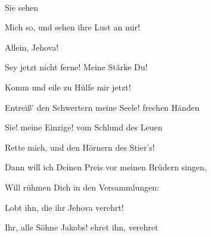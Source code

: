 \begin{aufza}
{\begin{aufzb}
\end{aufzb}\par
{}\par
\begin{aufzb}\item[]
\par
{}~\par
\end{aufzb}\par
{} Sie sehen\par
\begin{aufzb}\item[]
Mich so, und sehen ihre Lust an mir!\par
{}\par
\end{aufzb}\par
{} Allein, Jehova!\par
\begin{aufzb}\item[]
Sey jetzt nicht ferne! Meine Stärke Du!\par
Komm und eile zu Hülfe mir jetzt!\par
\end{aufzb}\par
Entreiß' den Schwertern meine Seele! frechen Händen\par
\begin{aufzb}\item[]
Sie! meine Einzige! vom Schlund des Leuen\par
Rette mich, und den Hörnern des Stier's!\par
\end{aufzb}\par
Dann will ich Deinen Preis vor meinen Brüdern singen,\par
\begin{aufzb}\item[]
Will rühmen Dich in den Versammlungen:\par
Lobt ihn, die ihr Jehova verehrt!\par
\end{aufzb}\par
Ihr, alle Söhne Jakobs! ehret ihn, verehret\par
\begin{aufzb}\item[]

\end{aufzb}}
\end{aufza}
